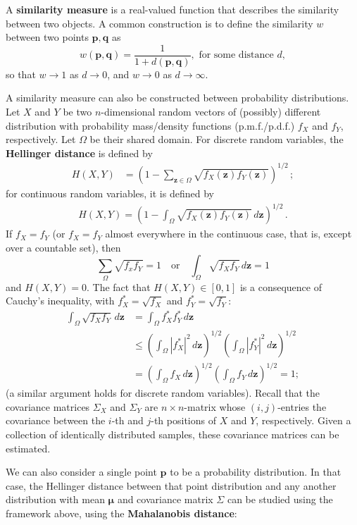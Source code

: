A \textbf{similarity measure} is a real-valued function that describes the similarity between two objects.
A common construction is to define the similarity $w$ between two points $\mathbf{p},\mathbf{q}$ as $$w(\mathbf{p},\mathbf{q})=\frac{1}{1+d(\mathbf{p},\mathbf{q})}, \text{ for some distance }d,$$ so that $w\to 1$ as $d\to 0$, and $w\to 0$ as $d\to \infty$. \par  
A similarity measure can also be constructed between probability distributions.
Let $X$ and $Y$ be two $n$-dimensional random vectors of (possibly) different distribution with probability mass/density functions (p.m.f./p.d.f.) $f_X$ and $f_Y$, respectively. Let $\Omega$ be their shared domain.
For discrete random variables, the \textbf{Hellinger distance} is defined by 
\begin{align*}
H(X,Y)&=\left(1- \sum_{\mathbf{z} \in \Omega} \sqrt{f_X(\mathbf{z}) f_Y(\mathbf{z})}\right)^{1/2}\,;
\end{align*}
for continuous random variables, it is defined by
\begin{align*}
H(X,Y)= \left(1-\int_{\Omega} \sqrt{f_X(\mathbf{z}) f_Y(\mathbf{z})}\, d\mathbf{z}\right)^{1/2}\,. 
\end{align*} 
If $f_X=f_Y$ (or $f_X=f_Y$ almost everywhere in the continuous case, that is, except over a countable set), then $$\sum_{\Omega}\sqrt{f_xf_Y}=1 \quad\mbox{or} \quad \int_{\Omega}\sqrt{f_Xf_Y}\, d\mathbf{z}=1$$ and $H(X,Y)=0$. The fact that $H(X,Y)\in [0,1]$ is a consequence of Cauchy's inequality, with $f_X^*=\sqrt{f_X}$ and $f_Y^*=\sqrt{f_Y}$: \begin{align*}\int_{\Omega}\sqrt{f_Xf_Y}\, d\mathbf{z}&=\int_{\Omega}f_X^*f_Y^*\, d\mathbf{z}\\ &\leq \left(\int_{\Omega}|f_X^*|^2\, d\mathbf{z}\right)^{1/2}\left(\int_{\Omega}|f_Y^*|^2\, d\mathbf{z}\right)^{1/2} \\ &=\left(\int_{\Omega}f_X\, d\mathbf{z}\right)^{1/2}\left(\int_{\Omega}f_Y\, d\mathbf{z}\right)^{1/2}=1;\end{align*}
(a similar argument holds for discrete random variables). 
\newline\newline Recall that the covariance matrices $\Sigma_X$ and $\Sigma_Y$ are $n \times n$-matrix whose $(i,j)$-entries the covariance between the $i$-th and $j$-th positions of $X$ and $Y$, respectively. Given a collection of identically distributed samples, these covariance matrices can be estimated.

We can also consider a single point $\mathbf{p}$ to be a probability distribution. In that case, the Hellinger distance between that point distribution and any another distribution with mean $\mathbf{\mu}$ and covariance matrix $\Sigma$ can be studied using the framework above, using the  \textbf{Mahalanobis distance}:

